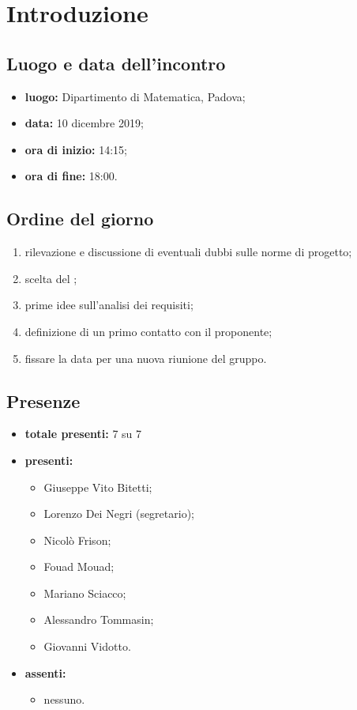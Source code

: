 \section*{Introduzione}

\subsection*{Luogo e data dell'incontro}
	\begin{itemize}
		\item \textbf{luogo:} Dipartimento di Matematica, Padova;
		\item \textbf{data:} 10 dicembre 2019;
		\item \textbf{ora di inizio:} 14:15;
		\item \textbf{ora di fine:} 18:00.
	\end{itemize}

\subsection*{Ordine del giorno}
	\begin{enumerate}

		\item rilevazione e discussione di eventuali dubbi sulle norme di progetto;
		\item scelta del ;
		\item prime idee sull'analisi dei requisiti;
		\item definizione di un primo contatto con il proponente;
		\item fissare la data per una nuova riunione del gruppo.

	\end{enumerate}

\subsection*{Presenze}
	\begin{itemize}
		\item \textbf{totale presenti:} 7 su 7
		\item \textbf{presenti: }
			\begin{itemize}			
				\item Giuseppe Vito Bitetti;
				\item Lorenzo Dei Negri (segretario);
				\item Nicolò Frison;
				\item Fouad Mouad;
				\item Mariano Sciacco;
				\item Alessandro Tommasin;
				\item Giovanni Vidotto.
			\end{itemize}
		\item \textbf{assenti: } 
			\begin{itemize}	
				\item nessuno.
			\end{itemize}
	\end{itemize}


